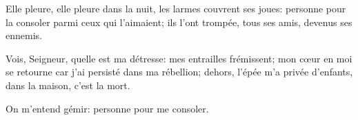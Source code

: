 Elle pleure, elle pleure dans la nuit, les larmes couvrent ses joues: personne pour la consoler parmi ceux qui l’aimaient; ils l’ont trompée, tous ses amis, devenus ses ennemis.

Vois, Seigneur, quelle est ma détresse: mes entrailles frémissent; mon cœur en moi se retourne car j’ai persisté dans ma rébellion; dehors, l’épée m’a privée d’enfants, dans la maison, c’est la mort.

On m’entend gémir: personne pour me consoler.